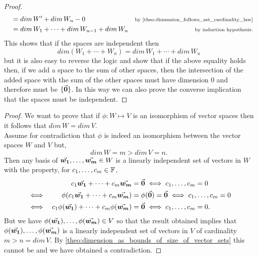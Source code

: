 \documentclass[MathsNotesBase.tex]{subfiles}
\begin{document}
{\begin{proof}
\begin{align*}
		& &  &= dim\,W' + dim\,W_n - 0  &\sidecomment{by \autoref{theo:dimension_follows_set_cardinality_law}} \\
		& &  &= dim\,W_1 + \cdots + dim\,W_{n-1} + dim\,W_n  &\sidecomment{by induction hypothesis.}
		\end{align*}
		This shows that if the spaces are independent then 
		\[ dim(W_1 + \cdots + W_n) = dim\,W_1 + \cdots + dim\,W_n \]
		but it is also easy to reverse the logic and show that if the above equality holds then, if we add a space to the sum of other spaces, then the intersection of the added space with the sum of the other spaces must have dimension 0 and therefore must be $\{\vec{\bm{0}}\}$. In this way we can also prove the converse implication that the spaces must be independent.
	\end{proof}

	\bigskip
	\begin{proof}
		We want to prove that if ${ \phi: W \longmapsto V }$ is an isomorphism of vector spaces then it follows that ${ dim\,W = dim\,V }$.\\
		Assume for contradiction that $\phi$ is indeed an isomorphism between the vector spaces $W$ and $V$ but,
		\[ dim\,W = m > dim\,V = n. \]
		Then any basis of ${ \vec{\bm{w_1}}, \dots, \vec{\bm{w_m}} \in W }$ is a linearly independent set of vectors in $W$ with the property, for ${ c_1,\dots,c_m \in \mathbb{F}^{} }$,
		\begin{align*}
		&& c_1\vec{\bm{w_1}} + \dots + c_m\vec{\bm{w_m}} &= \vec{\bm{0}} \iff c_1,\dots,c_m = 0  \\
		&\iff & \phi(c_1\vec{\bm{w_1}} + \dots + c_m\vec{\bm{w_m}}) &= \phi(\vec{\bm{0}}) = \vec{\bm{0}} \iff c_1,\dots,c_m = 0 \\
		&\iff & c_1\phi(\vec{\bm{w_1}}) + \dots + c_m\phi(\vec{\bm{w_m}}) &= \vec{\bm{0}} \iff c_1,\dots,c_m = 0. \\
		\end{align*}
		But we have ${ \phi(\vec{\bm{w_1}}), \dots, \phi(\vec{\bm{w_m}}) \in V }$ so that the result obtained implies that ${ \phi(\vec{\bm{w_1}}), \dots, \phi(\vec{\bm{w_m}}) }$ is a linearly independent set of vectors in $V$ of cardinality ${ m > n = dim\,V }$. By \autoref{theo:dimension_as_bounds_of_size_of_vector_sets} this cannot be and we have obtained a contradiction. 
	\end{proof}

	\bigskip
	
}
\end{document}
